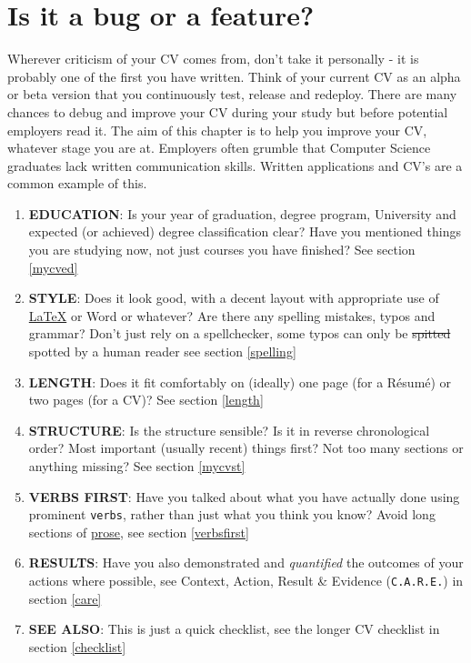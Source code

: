\documentclass[
]{book}
\providecommand{\tightlist}{%
  \setlength{\itemsep}{0pt}\setlength{\parskip}{0pt}}
\begin{document}
\hypertarget{mycv}{%
\section{Is it a bug or a feature?}\label{mycv}}

Wherever criticism of your CV comes from, don't take it personally - it is probably one of the first you have written. Think of your current CV as an alpha or beta version that you continuously test, release and redeploy. There are many chances to debug and improve your CV during your study but before potential employers read it. The aim of this chapter is to help you improve your CV, whatever stage you are at. Employers often grumble that Computer Science graduates lack written communication skills. Written applications and CV's are a common example of this.

\begin{enumerate}
\def\labelenumi{\arabic{enumi}.}
\tightlist
\item
  \textbf{EDUCATION}: Is your year of graduation, degree program, University and expected (or achieved) degree classification clear? Have you mentioned things you are studying now, not just courses you have finished? See section \ref{mycved}
\item
  \textbf{STYLE}: Does it look good, with a decent layout with appropriate use of \href{https://latex4year1.netlify.app/}{LaTeX} or Word or whatever? \citep{latex4year1} Are there any spelling mistakes, typos and grammar? Don't just rely on a spellchecker, some typos can only be \sout{spitted} spotted by a human reader see section \ref{spelling}
\item
  \textbf{LENGTH}: Does it fit comfortably on (ideally) one page (for a Résumé) or two pages (for a CV)? See section \ref{length}
\item
  \textbf{STRUCTURE}: Is the structure sensible? Is it in reverse chronological order? Most important (usually recent) things first? Not too many sections or anything missing? See section \ref{mycvst}
\item
  \textbf{VERBS FIRST}: Have you talked about what you have actually done using prominent \texttt{verbs}, rather than just what you think you know? Avoid long sections of \href{https://en.wikipedia.org/wiki/Prose}{prose}, see section \ref{verbsfirst}
\item
  \textbf{RESULTS}: Have you also demonstrated and \emph{quantified} the outcomes of your actions where possible, see Context, Action, Result \& Evidence (\texttt{C.A.R.E.}) in section \ref{care}
\item
  \textbf{SEE ALSO}: This is just a quick checklist, see the longer CV checklist in section \ref{checklist}
\end{enumerate}
\end{document}
